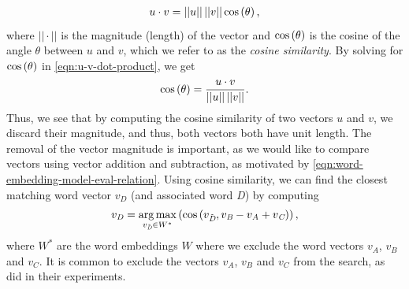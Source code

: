 \begin{align}
    u \cdot v = ||u||\,||v|| \cos\left(\theta\right),
    \label{eqn:u-v-dot-product}
\end{align}
where $||\cdot||$ is the magnitude (length) of the vector and $\cos \left(\theta\right)$ is the cosine of the angle $\theta$ between $u$ and $v$, which we refer to as the \textit{cosine similarity}. By solving for $\cos \left(\theta\right)$ in \cref{eqn:u-v-dot-product}, we get
\begin{align}
    \cos\left(\theta\right) = \frac{u \cdot v}{||u||\,||v||}.
    \label{eqn:cosine-similarity}
\end{align}
Thus, we see that by computing the cosine similarity of two vectors $u$ and $v$, we discard their magnitude, and thus, both vectors both have unit length. The removal of the vector magnitude is important, as we would like to compare vectors using vector addition and subtraction, as motivated by \cref{eqn:word-embedding-model-eval-relation}. Using cosine similarity, we can find the closest matching word vector $v_{\textit{D}}$ (and associated word \textit{D}) by computing
\begin{align}
    v_{\textit{D}} = \operatorname*{arg\,max}_{v_{\Tilde{\textit{D}}} \in W^*} \left(\cos \left(v_{\Tilde{\textit{D}}}, v_{\textit{B}} - v_{\textit{A}} + v_{\textit{C}}\right)\right),
\end{align}
where $W^*$ are the word embeddings $W$ where we exclude the word vectors $v_{\textit{A}}$, $v_{\textit{B}}$ and $v_{\textit{C}}$. It is common to exclude the vectors $v_{\textit{A}}$, $v_{\textit{B}}$ and $v_{\textit{C}}$ from the search, as \cite{mikolov2013a} did in their experiments.

